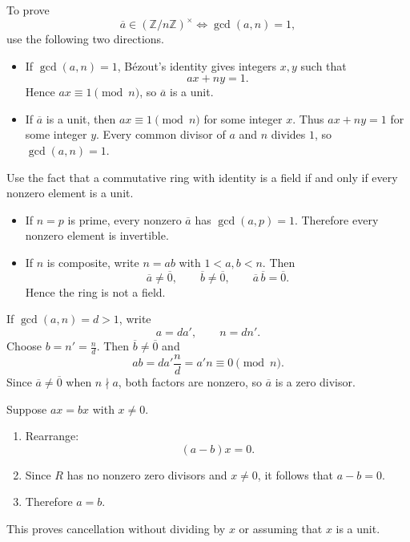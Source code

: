 \begin{method}
  To prove
  \[
  \overline{a}\in(\mathbb{Z}/n\mathbb{Z})^\times
  \iff\gcd(a,n)=1,
  \]
  use the following two directions.

  \begin{itemize}
    \item[$(\Leftarrow)$] If $\gcd(a,n)=1$, Bézout's identity gives integers $x,y$ such that
    \[
    ax+ny=1.
    \]
    Hence $ax\equiv1\pmod n$, so $\overline{a}$ is a unit.

    \item[$(\Rightarrow)$] If $\overline{a}$ is a unit, then $ax\equiv1\pmod n$ for some integer $x$. Thus $ax+ny=1$ for some integer $y$. Every common divisor of $a$ and $n$ divides $1$, so $\gcd(a,n)=1$.
  \end{itemize}
\end{method}

\begin{method}
  Use the fact that a commutative ring with identity is a field if and only if every nonzero element is a unit.

  \begin{itemize}
    \item If $n=p$ is prime, every nonzero $\overline{a}$ has $\gcd(a,p)=1$. Therefore every nonzero element is invertible.
    \item If $n$ is composite, write $n=ab$ with $1<a,b<n$. Then
    \[
    \overline{a}\neq\overline{0},\qquad
    \overline{b}\neq\overline{0},\qquad
    \overline{a}\,\overline{b}=\overline{0}.
    \]
    Hence the ring is not a field.
  \end{itemize}
\end{method}

\begin{method}
  If $\gcd(a,n)=d>1$, write
  \[
  a=da',\qquad n=dn'.
  \]
  Choose $b=n'=\frac{n}{d}$. Then $\overline{b}\neq\overline{0}$ and
  \[
  ab=da'\frac{n}{d}=a'n\equiv0\pmod n.
  \]
  Since $\overline{a}\neq\overline{0}$ when $n\nmid a$, both factors are nonzero, so $\overline{a}$ is a zero divisor.
\end{method}

\begin{method}
  Suppose $ax=bx$ with $x\neq0$.

  \begin{enumerate}
    \item Rearrange:
    \[
    (a-b)x=0.
    \]
    \item Since $R$ has no nonzero zero divisors and $x\neq0$, it follows that $a-b=0$.
    \item Therefore $a=b$.
  \end{enumerate}

  This proves cancellation without dividing by $x$ or assuming that $x$ is a unit.
\end{method}

